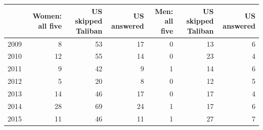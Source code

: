 \begin{tabular}{lrrrrrr}
\toprule
 & Women: all five & US \textbar{} skipped Taliban & US \textbar{} answered & Men: all five & US \textbar{} skipped Taliban & US \textbar{} answered \\
\midrule
2009 & 8 & 53 & 17 & 0 & 13 & 6 \\
2010 & 12 & 55 & 14 & 0 & 23 & 4 \\
2011 & 9 & 42 & 9 & 1 & 14 & 6 \\
2012 & 5 & 20 & 8 & 0 & 12 & 5 \\
2013 & 14 & 46 & 17 & 0 & 17 & 4 \\
2014 & 28 & 69 & 24 & 1 & 17 & 6 \\
2015 & 11 & 46 & 11 & 1 & 27 & 7 \\
\bottomrule
\end{tabular}

